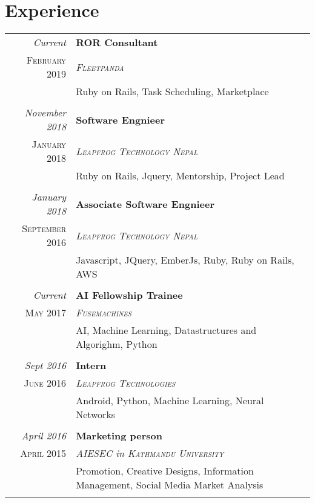 \documentclass[a4paper,10pt]{article}
\begin{document}
\section{Experience}
\begin{tabular}{r|p{11cm}}
\emph{Current	} & \textbf{ROR Consultant}\\ \textsc{February 2019} & \emph{\textsc{Fleetpanda}} \\&\footnotesize{Ruby on Rails, Task Scheduling, Marketplace}\\\multicolumn{2}{c}{} \\
\emph{November 2018	} & \textbf{Software Engnieer}\\ \textsc{January 2018} & \emph{\textsc{Leapfrog Technology Nepal}} \\&\footnotesize{Ruby on Rails, Jquery, Mentorship, Project Lead}\\\multicolumn{2}{c}{} \\
\emph{January 2018} & \textbf{Associate Software Engnieer}\\ \textsc{September 2016} & \emph{\textsc{Leapfrog Technology Nepal}} \\&\footnotesize{Javascript, JQuery, EmberJs, Ruby, Ruby on Rails, AWS}\\\multicolumn{2}{c}{} \\
 \emph{Current} & \textbf{AI Fellowship Trainee}\\ \textsc{May 2017} & \emph{\textsc{Fusemachines}} \\&\footnotesize{AI, Machine Learning, Datastructures and Algorighm, Python}\\\multicolumn{2}{c}{} \\
 \emph{Sept 2016} & \textbf{Intern}\\ \textsc{June 2016} & \emph{\textsc{Leapfrog Technologies}} \\&\footnotesize{Android, Python, Machine Learning, Neural Networks}\\\multicolumn{2}{c}{} \\
 \emph{April 2016} & \textbf{Marketing person}\\ \textsc{April 2015} & \emph{\textsc{AIESEC} in \textsc{Kathmandu University}} \\&\footnotesize{Promotion, Creative Designs, Information Management, Social Media Market Analysis}\\\multicolumn{2}{c}{} \\
\end{tabular}
\end{document}
